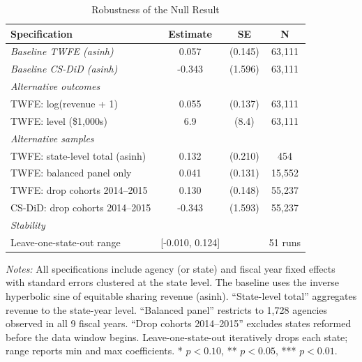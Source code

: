 \begin{table}[H]
\centering
\caption{Robustness of the Null Result}
\label{tab:robust}
\begin{threeparttable}
\begin{tabular}{lccc}
\toprule
Specification & Estimate & SE & N \\
\midrule
\textit{Baseline TWFE (asinh)} & 0.057 & (0.145) & 63,111 \\
\textit{Baseline CS-DiD (asinh)} & -0.343 & (1.596) & 63,111 \\
\midrule
\multicolumn{4}{l}{\textit{Alternative outcomes}} \\
TWFE: log(revenue + 1) & 0.055 & (0.137) & 63,111 \\
TWFE: level (\$1,000s) & 6.9 & (8.4) & 63,111 \\
\midrule
\multicolumn{4}{l}{\textit{Alternative samples}} \\
TWFE: state-level total (asinh) & 0.132 & (0.210) & 454 \\
TWFE: balanced panel only & 0.041 & (0.131) & 15,552 \\
TWFE: drop cohorts 2014--2015 & 0.130 & (0.148) & 55,237 \\
CS-DiD: drop cohorts 2014--2015 & -0.343 & (1.593) & 55,237 \\
\midrule
\multicolumn{4}{l}{\textit{Stability}} \\
Leave-one-state-out range & [-0.010, 0.124] & & 51 runs \\
\bottomrule
\end{tabular}
\begin{tablenotes}[flushleft]
\small
\item \textit{Notes:} All specifications include agency (or state) and fiscal year fixed effects with standard errors clustered at the state level. The baseline uses the inverse hyperbolic sine of equitable sharing revenue (asinh). ``State-level total'' aggregates revenue to the state-year level. ``Balanced panel'' restricts to 1,728 agencies observed in all 9 fiscal years. ``Drop cohorts 2014--2015'' excludes states reformed before the data window begins. Leave-one-state-out iteratively drops each state; range reports min and max coefficients. * $p<0.10$, ** $p<0.05$, *** $p<0.01$.
\end{tablenotes}
\end{threeparttable}
\end{table}
